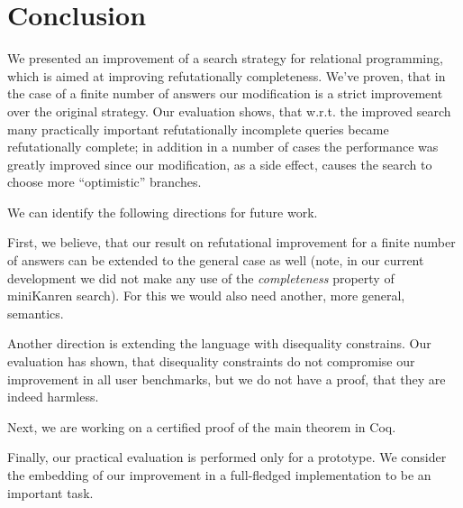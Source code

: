 \section{Conclusion}
\label{conclusion}

We presented an improvement of a search strategy for relational programming, which is aimed at
improving refutationally completeness. We've proven, that in the case of a finite number of 
answers our modification is a strict improvement over the original strategy. Our evaluation 
shows, that w.r.t. the improved search many practically important refutationally incomplete 
queries became refutationally complete; in addition in a number of cases the performance was greatly 
improved since our modification, as a side effect, causes the search to choose more 
``optimistic'' branches. 

We can identify the following directions for future work. 

First, we believe, that our result on refutational improvement for a finite number of answers 
can be extended to the general case as well (note, in our current development we did not make 
any use of the \emph{completeness} property of miniKanren search). For this we would also need 
another, more general, semantics. 

Another direction is extending the language with disequality constrains. Our evaluation has 
shown, that disequality constraints do not compromise our improvement in all user benchmarks, 
but we do not have a proof, that they are indeed harmless.

Next, we are working on a certified proof of the main theorem in Coq.

Finally, our practical evaluation is performed only for a prototype. 
We consider the embedding of our improvement in a full-fledged implementation to be
an important task. 

